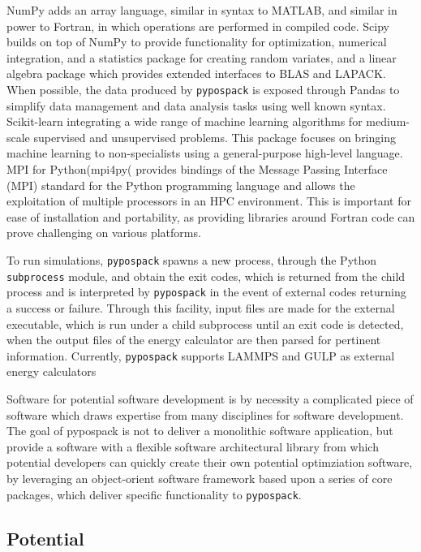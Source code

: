 NumPy\cite{walt2011_numpy} adds an array language, similar in syntax to MATLAB, and similar in power to Fortran, in which operations are performed in compiled code.
Scipy\cite{jones_scipy} builds on top of NumPy to provide functionality for optimization, numerical integration, and a statistics package for creating random variates, and a linear algebra package which provides extended interfaces to BLAS\cite{blas2002} and LAPACK\cite{anderson1990_lapack}.
When possible, the data produced by \verb|pypospack| is exposed through Pandas\cite{mckinney2010_pandas} to simplify data management and data analysis tasks using well known syntax.
Scikit-learn\cite{pedregosa2011_sklearn} integrating a wide range of machine learning algorithms for medium-scale supervised and unsupervised problems. This package focuses on bringing machine learning to non-specialists using a general-purpose high-level language.
MPI for Python(mpi4py(\cite{dalcin2005_mpi4py,dalcin2008_mpi4py} provides bindings of the Message Passing Interface (MPI)\cite{mpi2015} standard for the Python programming language and allows the exploitation of multiple processors in an HPC environment.
This is important for ease of installation and portability, as providing libraries around Fortran code can prove challenging on various platforms.

To run simulations, \verb|pypospack| spawns a new process, through the Python \verb|subprocess| module, and obtain the exit codes, which is returned from the child process and is interpreted by \verb|pypospack| in the event of external codes returning a success or failure.  Through this facility, input files are made for the external executable, which is run under a child subprocess until an exit code is detected, when the output files of the energy calculator are then parsed for pertinent information.  Currently, \verb|pypospack| supports LAMMPS and GULP as external energy calculators

Software for potential software development is by necessity a complicated piece of software which draws expertise from many disciplines for software development.  The goal of pypospack is not to deliver a monolithic software application, but provide a software with a flexible software architectural library from which potential developers can quickly create their own potential optimziation software, by leveraging an object-orient software framework based upon a series of core packages, which deliver specific functionality to \verb|pypospack|.


\subsection{Potential}


